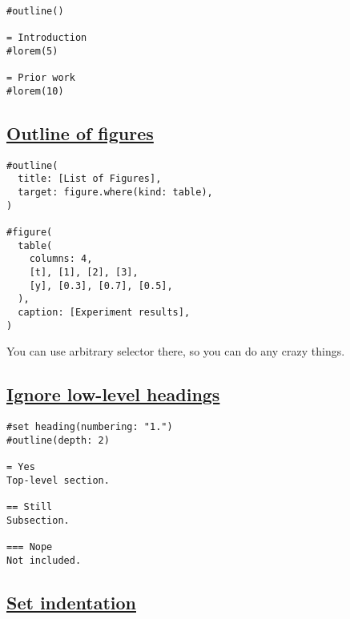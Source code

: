 \begin{verbatim}
#outline()

= Introduction
#lorem(5)

= Prior work
#lorem(10)
\end{verbatim}

\pandocbounded{}

\subsection{\texorpdfstring{\hyperref[outline-of-figures]{Outline of
figures}}{Outline of figures}}\label{outline-of-figures}

\begin{verbatim}
#outline(
  title: [List of Figures],
  target: figure.where(kind: table),
)

#figure(
  table(
    columns: 4,
    [t], [1], [2], [3],
    [y], [0.3], [0.7], [0.5],
  ),
  caption: [Experiment results],
)
\end{verbatim}

\pandocbounded{}

You can use arbitrary selector there, so you can do any crazy things.

\subsection{\texorpdfstring{\hyperref[ignore-low-level-headings]{Ignore
low-level
headings}}{Ignore low-level headings}}\label{ignore-low-level-headings}

\begin{verbatim}
#set heading(numbering: "1.")
#outline(depth: 2)

= Yes
Top-level section.

== Still
Subsection.

=== Nope
Not included.
\end{verbatim}

\pandocbounded{}

\subsection{\texorpdfstring{\hyperref[set-indentation]{Set
indentation}}{Set indentation}}\label{set-indentation}

